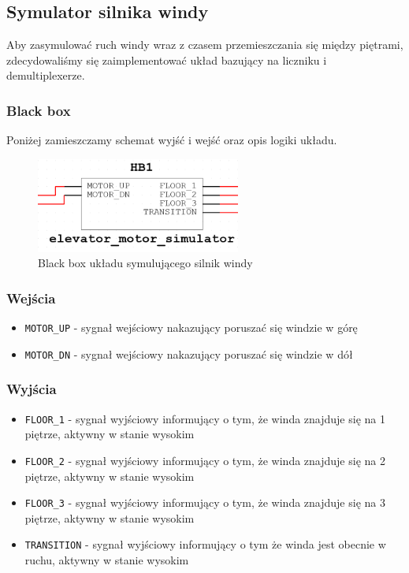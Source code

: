 \documentclass[a4paper]{article}
\begin{document}
\pagebreak
\subsection{Symulator silnika windy}
Aby zasymulować ruch windy wraz z czasem przemieszczania się między piętrami, zdecydowaliśmy się 
zaimplementować układ bazujący na liczniku i demultiplexerze.

\subsubsection{Black box}
Poniżej zamieszczamy schemat wyjść i wejść oraz opis logiki układu.
\begin{figure}[H]
    \centering
    \includegraphics[width=0.6\textwidth]{elevator_motor_simulator.png}
    \caption{Black box układu symulującego silnik windy}
\end{figure}
\subsubsection{Wejścia}
\begin{itemize}
    \item \verb|MOTOR_UP| - sygnał wejściowy nakazujący poruszać się windzie w górę
    \item \verb|MOTOR_DN| - sygnał wejściowy nakazujący poruszać się windzie w dół
\end{itemize}
\subsubsection{Wyjścia}
\begin{itemize}
    \item \verb|FLOOR_1| - sygnał wyjściowy informujący o tym, że winda znajduje się na 1 piętrze,
                            aktywny w stanie wysokim
    \item \verb|FLOOR_2| - sygnał wyjściowy informujący o tym, że winda znajduje się na 2 piętrze,
                            aktywny w stanie wysokim
    \item \verb|FLOOR_3| - sygnał wyjściowy informujący o tym, że winda znajduje się na 3 piętrze,
                            aktywny w stanie wysokim
    \item \verb|TRANSITION| - sygnał wyjściowy informujący o tym że winda jest obecnie w ruchu,
                            aktywny w stanie wysokim
\end{itemize}
\end{document}
